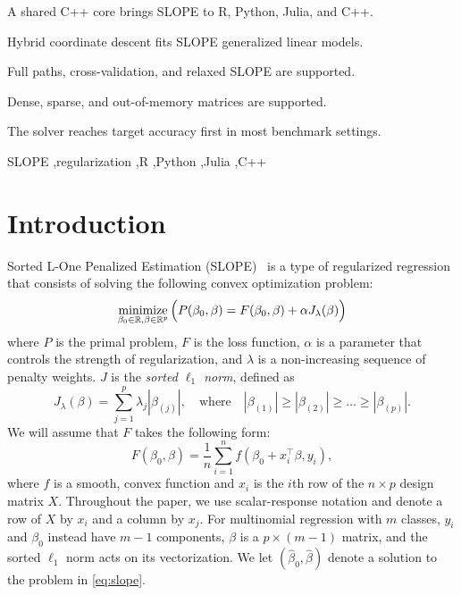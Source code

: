 \documentclass[a4paper,fleqn]{cas-sc}
\begin{document}
\begin{highlights}
  \item A shared C++ core brings SLOPE to R, Python, Julia, and C++.

  \item Hybrid coordinate descent fits SLOPE generalized linear models.

  \item Full paths, cross-validation, and relaxed SLOPE are supported.

  \item Dense, sparse, and out-of-memory matrices are supported.

  \item The solver reaches target accuracy first in most benchmark settings.
\end{highlights}

\begin{keywords}
  SLOPE \sep regularization \sep R \sep Python \sep Julia \sep C++
\end{keywords}

\maketitle

\section{Introduction}

Sorted L-One Penalized Estimation (SLOPE)~\citep{bogdan2013, zeng2014,
bogdan2015} is a type of regularized regression that consists of solving the
following convex optimization problem:
\begin{equation}
  \label{eq:slope}
  \operatorname*{minimize}_{\beta_0 \in \mathbb{R},\beta \in \mathbb{R}^p} \Big( P(\beta_0,\beta) = F(\beta_0, \beta) + \alpha J_\lambda(\beta) \Big)
\end{equation}
%
where \(P\) is the primal problem, \(F\) is the loss function, \(\alpha\) is a
parameter that controls the strength of regularization, and \(\lambda\) is a
non-increasing sequence of penalty weights. \(J\) is the \emph{sorted $\ell_1$
norm}, defined as
\begin{equation}
  J_\lambda(\beta) = \sum_{j=1}^p \lambda_j |\beta_{(j)}|, \quad \text{where}\quad |\beta_{(1)}| \geq |\beta_{(2)}| \geq \ldots \geq |\beta_{(p)}|.
\end{equation}
We will assume that \(F\) takes the following form:
\[
  F( \beta_0, \beta ) = \frac{1}{n} \sum_{i=1}^n f( \beta_0 + x_i^\intercal \beta , y_i),
\]
where \(f\) is a smooth, convex function and \(x_i\) is the \(i\)th row of the
\(n \times p\) design matrix \(X\). Throughout the paper, we use scalar-response
notation and denote a row of \(X\) by \(x_i\) and a column by \(x_j\). For
multinomial regression with \(m\) classes, \(y_i\) and \(\beta_0\) instead have
\(m - 1\) components, \(\beta\) is a \(p \times (m - 1)\) matrix, and the sorted
\(\ell_1\) norm acts on its vectorization. We let
\((\hat{\beta}_0, \hat{\beta})\) denote a solution to the problem in
\autoref{eq:slope}.
\end{document}
